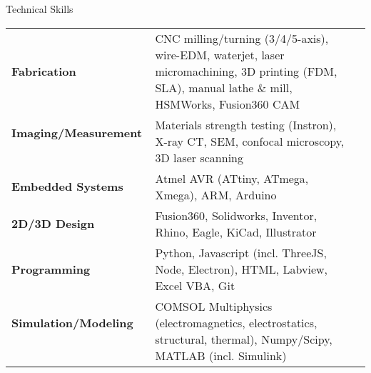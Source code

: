 \documentclass{resume} %
\begin{document}
\begin{rSection}{Technical Skills}
\begin{tabular}{ >{\bfseries} l p{} l}
Fabrication \ & CNC milling/turning (3/4/5-axis), wire-EDM, waterjet, laser micromachining, 3D printing (FDM, SLA), manual lathe \& mill, HSMWorks, Fusion360 CAM
\smallskip
\\Imaging/Measurement \ & Materials strength testing (Instron), X-ray CT, SEM, confocal microscopy, 3D laser scanning
\smallskip
\\Embedded Systems \ & Atmel AVR (ATtiny, ATmega, Xmega), ARM, Arduino
\smallskip
\\2D/3D Design \ & Fusion360, Solidworks, Inventor, Rhino, Eagle, KiCad, Illustrator
\smallskip
\\Programming \ & Python, Javascript (incl. ThreeJS, Node, Electron), HTML, Labview, Excel VBA, Git
\smallskip
\\Simulation/Modeling \ & COMSOL Multiphysics (electromagnetics, electrostatics, structural, thermal), Numpy/Scipy, MATLAB (incl. Simulink)
\end{tabular}

\end{rSection}

\end{document}
